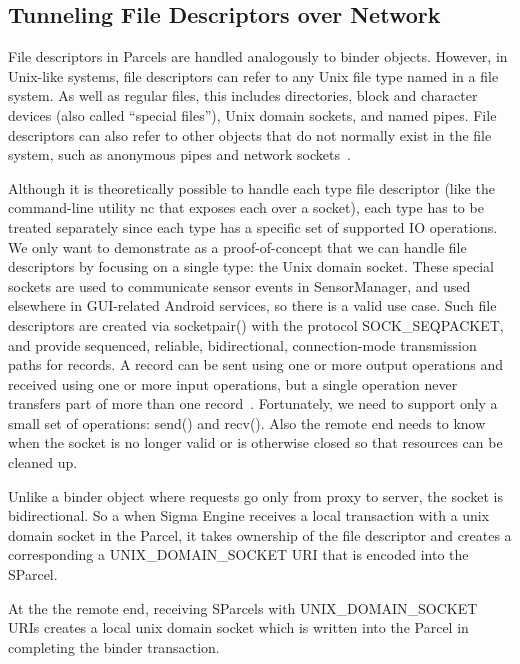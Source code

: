 \documentclass[prodmode]{acmlarge}
\begin{document}
\subsection{Tunneling File Descriptors over Network}
File descriptors in Parcels are handled analogously to binder objects. However, in Unix-like systems, file descriptors can refer to any Unix file type named in a file system. As well as regular files, this includes directories, block and character devices (also called ``special files''), Unix domain sockets, and named pipes. File descriptors can also refer to other objects that do not normally exist in the file system, such as anonymous pipes and network sockets~\cite{UnixDomainSocket}.

Although it is theoretically possible to handle each type file descriptor (like the command-line utility nc that exposes each over a socket), each type has to be treated separately since each type has a specific set of supported IO operations. We only want to demonstrate as a proof-of-concept that we can handle file descriptors by focusing on a single type: the Unix domain socket. These special sockets are used to communicate sensor events in SensorManager, and used elsewhere in GUI-related Android services, so there is a valid use case. Such file descriptors are created via socketpair() with the protocol SOCK\_SEQPACKET, and provide sequenced, reliable, bidirectional, connection-mode transmission paths for records. A record can be sent using one or more output operations and received using one or more input operations, but a single operation never transfers part of more than one record~\cite{SocketManPage}. Fortunately, we need to support only a small set of operations: send() and recv(). Also the remote end needs to know when the socket is no longer valid or is otherwise closed so that resources can be cleaned up.

Unlike a binder object where requests go only from proxy to server, the socket is bidirectional. So a when Sigma Engine receives a local transaction with a unix domain socket in the Parcel, it takes ownership of the file descriptor and creates a corresponding a UNIX\_DOMAIN\_SOCKET URI that is encoded into the SParcel.

At the the remote end, receiving SParcels with UNIX\_DOMAIN\_SOCKET URIs creates a local unix domain socket which is written into the Parcel in completing the binder transaction.
\end{document}
